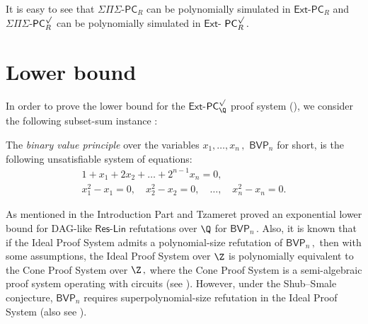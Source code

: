 \documentclass{toc}
\begin{document}
It is easy to see that $\Sigma \Pi \Sigma$-$\mathsf{PC}_R$ can be polynomially simulated in $\mathsf{Ext}$-$\mathsf{PC}_{R}$ and $\Sigma \Pi \Sigma$-$\mathsf{PC}_R^{\surd}$ can be polynomially simulated in $\mathsf{Ext}$-%
$\mathsf{PC}_{R}^{\surd}\,.$ %



\section{Lower bound}\label{section-3}

In order to prove the lower bound for the $\mathsf{Ext}$-$\mathsf{PC}^{\surd}_{\Q}$ proof system (), we consider the following subset-sum instance \cite{AGHT19_new, PT18_new}:


\begin{definition}
The \emph{binary value principle} over the variables %
$x_1,\dots, x_n\,,$ %
 $\mathsf{BVP}_n$  for short, is the following unsatisfiable system of equations:
\begin{align*}
1 + x_1 + 2 x_2 + \ldots + 2^{n - 1} x_n = 0, \\
x_1^2 - x_1 = 0, \quad x_2^2 - x_2 = 0, \quad \ldots, \quad x_n^2 - x_n = 0.
\end{align*}
\end{definition}

As %
mentioned in the %
Introduction  %
Part and Tzameret \cite{PT18_new} proved an exponential lower bound for DAG-like $\mathsf{Res}$-$\mathsf{Lin}$ refutations over $\Q$ for
%
%
$\mathsf{BVP}_n\,.$ %
 Also, it is known that if the Ideal Proof System admits
a %
%
polynomial-size refutation  %
of %
$\mathsf{BVP}_n\,,$ %
 then with some assumptions, the Ideal Proof System over $\Z$ is polynomially equivalent to the Cone Proof System over %
$\Z\,,$ %
 where the Cone Proof System is a semi-algebraic proof system operating with circuits (see \cite{AGHT19_new}). However, under the
%
Shub--Smale  %
conjecture, $\mathsf{BVP}_n$ requires %
superpolynomial-size  %
refutation in the Ideal Proof System (also see \cite{AGHT19_new}). 
\end{document}
